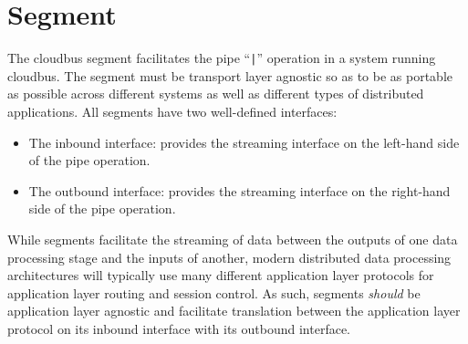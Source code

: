 \section{\AppName Segment}
The cloudbus segment facilitates the pipe ``\texttt{|}'' operation in a system running cloudbus. The segment must be transport layer %
agnostic so as to be as portable as possible across different systems as well as different types of distributed applications. %
All segments have two well-defined interfaces:
\begin{itemize}
	\item The inbound interface: provides the streaming interface on the left-hand side of the pipe operation.
	\item The outbound interface: provides the streaming interface on the right-hand side of the pipe operation.
\end{itemize}
While segments facilitate the streaming of data between the outputs of one data processing stage and the inputs of another, %
modern distributed data processing architectures will typically use many different application layer protocols for application %
layer routing and session control. As such, segments \emph{should} be application layer agnostic and facilitate %
translation between the application layer protocol on its inbound interface with its outbound interface.